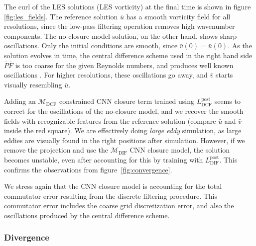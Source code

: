 \documentclass[preprint]{elsarticle}
\newcommand{\revboth}[1]{#1}
\begin{document}
The curl of the LES solutions (LES vorticity) at the final time is shown in
figure \ref{fig:les_fields}. The reference solution $\bar{u}$ has a smooth
vorticity field for all resolutions, since the low-pass filtering operation
removes high wavenumber components. The no-closure model solution, on the other
hand, shows sharp oscillations. Only the initial conditions are smooth, since
$\bar{v}(0) = \bar{u}(0)$. As the solution evolves in time, the central
difference scheme used in the right hand side $\bar{P} \bar{F}$ is too coarse
for the given Reynolds numbers, and produces well known oscillations
\cite{Shyy1985}. For
\revboth{ higher resolutions},
these oscillations go away, and $\bar{v}$ starts visually resembling $\bar{u}$.

Adding an $\mathcal{M}_{\text{DCF}}$ constrained CNN closure term
trained using $L^\text{post}_{\text{DCF}}$ seems to correct for the
oscillations of the no-closure model, and we recover the smooth fields with
recognizable features from the reference solution (compare $\bar{u}$ and
$\bar{v}$ inside the red square). We are effectively doing \emph{large eddy}
simulation, as large eddies are visually found in the right positions after
simulation. However, if we remove the projection and use the
$\mathcal{M}_{\text{DIF}}$ CNN closure model, the solution becomes
unstable, even after accounting for this by training with
$L^\text{post}_{\text{DIF}}$.
This confirms the observations from figure~\ref{fig:convergence}.

We stress again that the CNN closure model is accounting for the
total commutator error resulting from the discrete filtering procedure. This
commutator error includes the coarse grid discretization error, and also the
oscillations produced by the central difference scheme.

\subsubsection{Divergence}
\end{document}
